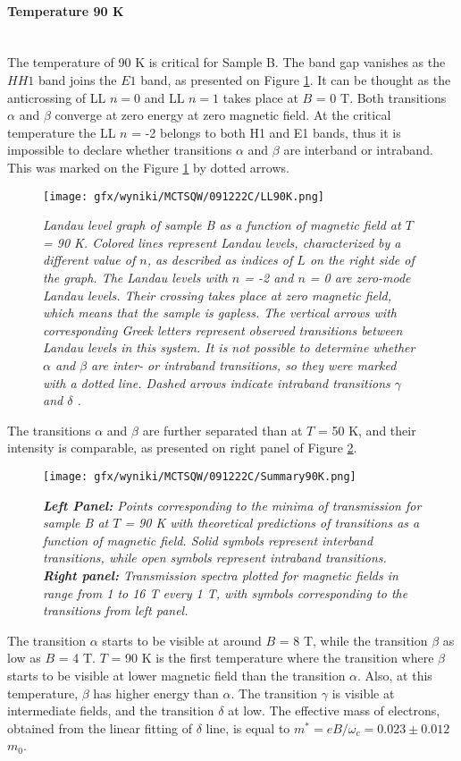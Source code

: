 \documentclass[titlepage,a4paper]{book}
\newcommand{\myparagraph}[1]{\paragraph{#1}\mbox{}\\}
\begin{document}
\myparagraph{Temperature 90 K}
The temperature of 90 K is critical for Sample B. The band gap vanishes as the $HH1$ band joins the $E1$ band, as presented on Figure \ref{fig:LL_SQW_90K}. It can be thought as the anticrossing of LL $n = 0$ and LL $n = 1$ takes place at $B$ = 0 T. Both transitions $\alpha$ and $\beta$ converge at zero energy at zero magnetic field. At the critical temperature the LL $n$ = -2 belongs to both H1 and E1 bands, thus it is impossible to declare whether transitions $\alpha$ and $\beta$ are interband or intraband. This was marked on the Figure \ref{fig:LL_SQW_90K} by dotted arrows.
\begin{figure}[ht]
	\centering
	\texttt{[image: gfx/wyniki/MCTSQW/091222C/LL90K.png]}
	\vspace{-10pt}
	\caption{\textit{Landau level graph of sample B as a function of magnetic field at $T$ = 90 K. Colored lines represent Landau levels, characterized by a different value of $n$, as described as indices of $L$ on the right side of the graph. The Landau levels with $n$ = -2 and $n$ = 0 are zero-mode Landau levels. Their crossing takes place at zero magnetic field, which means that the sample is gapless. The vertical arrows with corresponding Greek letters represent observed transitions between Landau levels in this system. It is not possible to determine whether $\alpha$ and $\beta$ are inter- or intraband transitions, so they were marked with a dotted line. Dashed arrows indicate intraband transitions $\gamma$ and $\delta$ .}}
	\label{fig:LL_SQW_90K}
\end{figure}

The transitions $\alpha$ and $\beta$ are further separated than at $T$ = 50 K, and their intensity is comparable, as presented on right panel of Figure \ref{fig:Summary_SQW_90K}.

\begin{figure}[ht]
	\centering
	\texttt{[image: gfx/wyniki/MCTSQW/091222C/Summary90K.png]}
	\vspace{-10pt}
	\caption{\textit{\textbf{Left Panel:} Points corresponding to the minima of transmission for sample B at $T$ = 90 K with theoretical predictions of transitions as a function of magnetic field. Solid symbols represent interband transitions, while open symbols represent intraband transitions. \textbf{Right panel:} Transmission spectra plotted for magnetic fields in range from 1 to 16 T every 1 T, with symbols corresponding to the transitions from left panel.}}
	\label{fig:Summary_SQW_90K}
\end{figure}
The transition $\alpha$ starts to be visible at around $B$ = 8 T, while the transition $\beta$ as low as $B$ = 4 T. $T$ = 90 K is the first temperature where the transition where $\beta$ starts to be visible at lower magnetic field than the transition $\alpha$. Also, at this temperature, $\beta$ has higher energy than $\alpha$. The transition $\gamma$ is visible at intermediate fields, and the transition $\delta$ at low. The effective mass of electrons, obtained from the linear fitting of $\delta$ line, is equal to $m^* = eB/\omega_c = 0.023 \pm 0.012$ $m_0$. 
\end{document}
